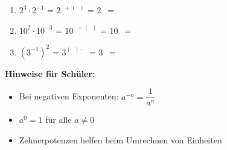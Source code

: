 \begin{enumerate}[label=\arabic*.]
    \begin{enumerate}[label=\alph*)]
        \item $2^3 \cdot 2^{-1}$ = $2^{\phantom{0}+(\phantom{0})}$ = $2^{\phantom{0}}$ = \underline{\hspace{3cm}}
        \vspace{0.5cm}

        \item $10^2 \cdot 10^{-3}$ = $10^{\phantom{0}+(\phantom{0})}$ = $10^{\phantom{0}}$ = \underline{\hspace{3cm}}
        \vspace{0.5cm}

        \item $(3^{-1})^2$ = $3^{(\phantom{0}) \cdot \phantom{0}}$ = $3^{\phantom{0}}$ = \underline{\hspace{3cm}}
    \end{enumerate}

\end{enumerate}

\vspace{1cm}
\textbf{Hinweise für Schüler:}
\begin{itemize}
    \item Bei negativen Exponenten: $a^{-n} = \dfrac{1}{a^n}$
    \item $a^0 = 1$ für alle $a \neq 0$
    \item Zehnerpotenzen helfen beim Umrechnen von Einheiten
\end{itemize}